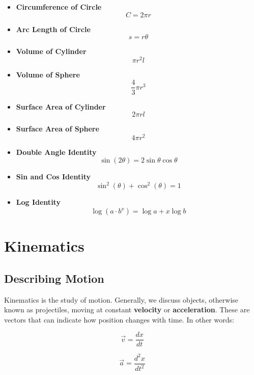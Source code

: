 \documentclass[a4paper, 11pt]{book}
\begin{document}
\begin{multicols}{2}
\begin{itemize}
\item \textbf{Circumference of Circle}
      \[C = 2\pi r\]

\item \textbf{Arc Length of Circle}
      \[s = r\theta\]

\item \textbf{Volume of Cylinder}
      \[\pi r^2 l\]

\item \textbf{Volume of Sphere}
      \[\frac{4}{3}\pi r^3\]

\item \textbf{Surface Area of Cylinder}
      \[2\pi rl\]


\item \textbf{Surface Area of Sphere}
      \[4\pi r^2\]

\item \textbf{Double Angle Identity}
      \[\sin(2\theta) = 2\sin\theta\cos\theta \]
      
\item \textbf{Sin and Cos Identity}
      \[\sin^2(\theta) + \cos^2(\theta) = 1\]

\item \textbf{Log Identity}
      \[\log(a \cdot b^x) = \log a + x \log b\]

\end{itemize}
\end{multicols}


\chapter{Kinematics}
\section{Describing Motion}
Kinematics is the study of motion. Generally, we discuss objects, otherwise known as projectiles,
moving at constant \textbf{velocity} or \textbf{acceleration}. These are vectors that can
indicate how position changes with time. In other words:

\begin{equation}
    \label{eq:velocity}
    \vec{v} = \frac{dx}{dt}
\end{equation}

\begin{equation}
    \label{eq:acceleration}
    \vec{a} = \frac{d^2x}{dt^2}
\end{equation}
\end{document}
